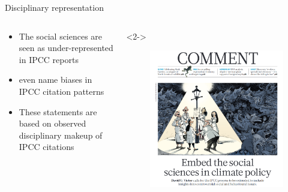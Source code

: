 \documentclass[9pt]{beamer}
\begin{document}
\begin{frame}{Disciplinary representation}
\begin{columns}
	\begin{column}{0.382\linewidth}
	\begin{itemize}
		\item<1-> The social sciences are seen as under-represented in IPCC reports
		\item<3-> \citet{Bjurström2011} even name biases in IPCC citation patterns
		\item<4-> These statements are based on observed disciplinary makeup of IPCC citations
		
	\end{itemize}
\end{column}
	\begin{column}{0.618\linewidth}<2->
		\begin{figure}[h!]
			\begin{center}
				\includegraphics[width=0.85\linewidth]{../plots/victor.png}
				\caption{\citep{Victor2015}}
			\end{center}
		\end{figure}
	\end{column}
\end{columns}
\end{frame}

\end{document}
